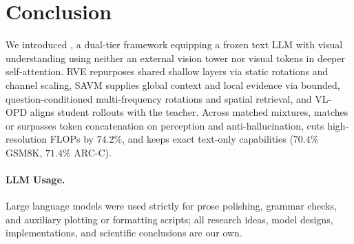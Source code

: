 \section{Conclusion}
\label{sec:conclusion}

We introduced \modelname{}, a dual-tier framework equipping a frozen text LLM
with visual understanding using neither an external vision tower nor visual
tokens in deeper self-attention. RVE repurposes shared shallow layers via
static rotations and channel scaling, SAVM supplies global context and local
evidence via bounded, question-conditioned multi-frequency rotations and
spatial retrieval, and VL-OPD aligns student rollouts with the teacher. Across
matched mixtures, \modelname{} matches or surpasses token concatenation on
perception and anti-hallucination, cuts high-resolution FLOPs by $74.2\%$, and
keeps exact text-only capabilities ($70.4\%$ GSM8K, $71.4\%$ ARC-C).

\paragraph{LLM Usage.}
Large language models were used strictly for prose polishing, grammar checks,
and auxiliary plotting or formatting scripts; all research ideas, model
designs, implementations, and scientific conclusions are our own.
